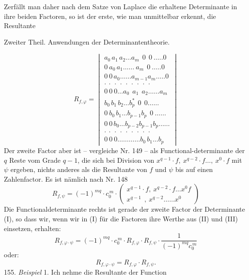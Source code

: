 \documentclass[11pt]{article}
\providecommand{\weberpage}[1]{}
\providecommand{\weq}[2]{\begin{equation}\tag{#1}#2\end{equation}}
\begin{document}
Zerf\"allt man daher nach dem Satze von Laplace die erhaltene Determinante in ihre beiden Factoren, so ist der erste, wie man unmittelbar erkennt, die Resultante


\weberpage{164}
Zweiter Theil. Anwendungen der Determinantentheorie.

\weq{II}{
R_{f,\varphi} =
\begin{vmatrix}
a_0\,a_1\,a_2\ldots a_m\ \ 0\ \ 0\ \ldots..0\\
0\ a_0\,a_1\ldots\ldots\ a_m\ \ 0\ \ldots..0\\
0\ 0\,a_0\ldots\ldots a_{m-1}a_m\ldots..0\\
\cdot\ \cdot\ \cdot\ \cdot\ \cdot\ \cdot\ \cdot\ \cdot\ \cdot\\
0\ 0\ 0\ldots a_0\ \ a_1\ \ a_2\ldots\ldots a_m\\
b_0\,b_1\,b_2\ldots b_p^{*}\ \ 0\ \ 0\ldots\ldots\\
0\ b_0\,b_1\ldots b_{p-1}b_p\ \ 0\ \ldots\ldots\\
0\ 0\,b_0\ldots b_{p-2}b_{p-1}b_p\ldots\ldots\\
\cdot\ \cdot\ \cdot\ \cdot\ \cdot\ \cdot\ \cdot\ \cdot\ \cdot\\
0\ 0\ 0\ldots\ldots\ldots\ldots b_0\,b_1\ldots b_p
\end{vmatrix}
}
Der zweite Factor aber ist -- vergleiche Nr. 149 -- als Functional-determinante der $q$ Reste vom Grade $q-1$, die sich bei Division von $x^{q-1}\cdot f,\ x^{q-2}\cdot f\ldots,\ x^0\cdot f$ mit $\psi$ ergeben, nichts anderes als die Resultante von $f$ und $\psi$ bis auf einen Zahlenfactor. Es ist n\"amlich nach Nr. 148
\weq{III}{
R_{f,\psi} = (-1)^{mq}\cdot c_0^{\,m}\cdot
\begin{pmatrix}
x^{q-1}\cdot f,\ x^{q-2}\cdot f\ldots x^0f\\
x^{q-1}\ \ ,\ x^{q-2}\ldots\ldots x^0
\end{pmatrix}
}
Die Functionaldeterminante rechts ist gerade der zweite Factor der Determinante (I), so dass wir, wenn wir in (I) f\"ur die Factoren ihre Werthe aus (II) und (III) einsetzen, erhalten:
\[
R_{f,\varphi\cdot\psi} = (-1)^{mq}\cdot c_0^{\,m}\cdot R_{f,\varphi}\cdot R_{f,\psi}\cdot \frac{1}{(-1)^{mq}c_0^{\,m}}
\]
oder:
\[
R_{f,\varphi\cdot\psi} = R_{f,\varphi}\cdot R_{f,\psi}.
\]
155. \textit{Beispiel} 1. Ich nehme die Resultante der Function
\end{document}

